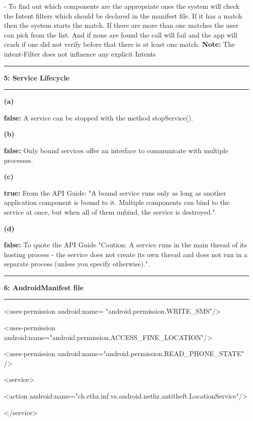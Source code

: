 \documentclass[11pt]{article}
\newcommand\question[2]{\vspace{.25in}\hrule\textbf{#1: #2}\vspace{.5em}\hrule\vspace{.10in}}
\renewcommand\part[1]{\vspace{.10in}\textbf{(#1)}}
\begin{document}
- To find out which components are the appropriate ones the system will check the Intent filters which should be declared in the manifest file.
If it has a match then the system starts the match. If there are more than one matches the user can pick from the list.
And if none are found the call will fail and the app will crash if one did not verify before that there is at least one match.\newline
\textbf{Note:} The intent-Filter does not influence any explicit Intents



\question{5}{Service Lifecycle} 

\part{a} 

\textbf{false:} A service can be stopped with the method stopService().

\part{b}

\textbf{false:} Only bound services offer an interface to communicate with multiple processes.

\part{c}

\textbf{true:} From the API Guide: "A bound service runs only as long as another application component is bound to it. Multiple components can bind to the service at once, but when all of them unbind, the service is destroyed."

\part{d}

\textbf{false:} To quote the API Guide "Caution: A service runs in the main thread of its hosting process - the service does not create its own thread and does not run in a separate process (unless you specify otherwise).".

\question{6}{AndroidManifest file}

 \textless uses-permission android:name= "android.permission.WRITE\_SMS"/\textgreater 
 
 
 \textless uses-permission android:name="android.permission.ACCESS\_FINE\_LOCATION"/\textgreater 
 
 
 \textless uses-permission android:name="android.permission.READ\_PHONE\_STATE" /\textgreater 
 
 \textless service\textgreater 
 
	 \textless action android:name="ch.ethz.inf.vs.android.nethz.antitheft.LocationService"/\textgreater	
	 
 \textless /service\textgreater 
\end{document}
